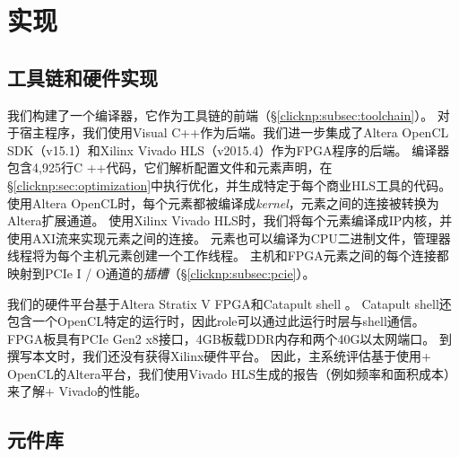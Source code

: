 \section{实现}
\label{clicknp:sec:impl}

\subsection{\name 工具链和硬件实现}
我们构建了一个\name 编译器，它作为\name 工具链的前端（\S \ref {clicknp:subsec:toolchain}）。
对于宿主程序，我们使用Visual C++作为后端。我们进一步集成了Altera OpenCL SDK（v15.1）\cite {aoc}和Xilinx Vivado HLS（v2015.4）\cite {vivado}作为FPGA程序的后端。
\name 编译器包含4,925行C ++代码，它们解析配置文件和元素声明，在\S \ref {clicknp:sec:optimization}中执行优化，并生成特定于每个商业HLS工具的代码。
使用Altera OpenCL时，每个\name 元素都被编译成\textit {kernel}，元素之间的连接被转换为Altera扩展通道。
使用Xilinx Vivado HLS时，我们将每个元素编译成IP内核，并使用AXI流来实现元素之间的连接。
元素也可以编译为CPU二进制文件，管理器线程将为每个主机元素创建一个工作线程。
主机和FPGA元素之间的每个连接都映射到PCIe I / O通道的\textit {插槽}（\S \ref {clicknp:subsec:pcie}）。

我们的硬件平台基于Altera Stratix V FPGA和Catapult shell \cite {putnam2014reconfigurable}。
Catapult shell还包含一个OpenCL特定的运行时，因此\name role可以通过此运行时层与shell通信。
FPGA板具有PCIe Gen2 x8接口，4GB板载DDR内存和两个40G以太网端口。
到撰写本文时，我们还没有获得Xilinx硬件平台。
因此，主系统评估基于使用\name + OpenCL的Altera平台，我们使用Vivado HLS生成的报告（例如频率和面积成本）来了解\name + Vivado的性能。

\subsection{\name 元件库}
\label{clicknp:subsec:lib}

